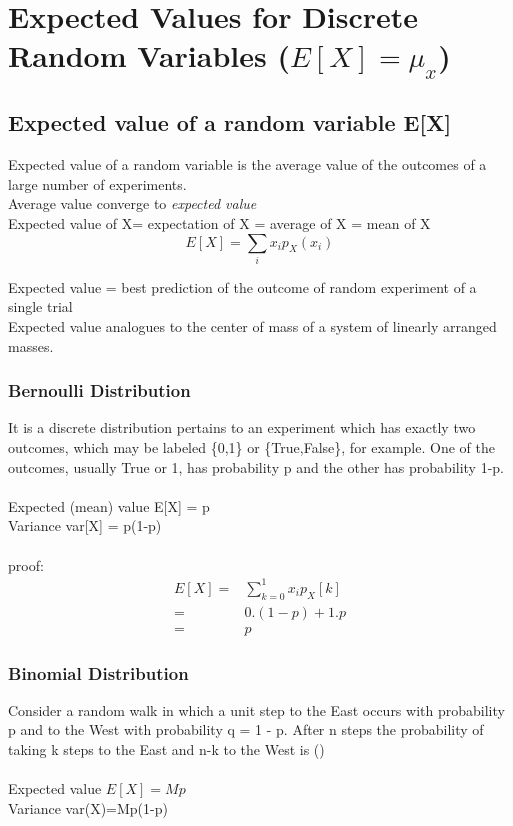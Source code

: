 \section{Expected Values for Discrete Random Variables  ($E[X]=\mu_{x}$)}
\subsection{Expected value of a random variable E[X]} 
Expected value of a random variable is the average value of the outcomes of a large number of experiments.\\

Average value converge to \emph{expected value}\\
{\color{red}Expected value} of X= {\color{red}expectation} of X = {\color{red}average} of X = {\color{red}mean} of X
\begin{equation*}
	E[X]=\sum_{i}x_{i}p_{X}(x_{i})
\end{equation*}

Expected value = best prediction of the outcome of random experiment of a single trial\\

Expected value analogues to the center of mass of a system of linearly arranged masses.

\subsubsection{Bernoulli Distribution}
It is a discrete distribution pertains to an experiment which has exactly two outcomes, which may be labeled \{0,1\} or \{True,False\}, for example. One of the outcomes, usually True or 1, has probability p and the other has probability 1-p. \\\\
{\color{blue}Expected (mean) value E[X] = p}\\
{\color{blue}Variance var[X] = p(1-p)}\\\\

proof:
\begin{equation*}
	\begin{split}
		E[X]
			=&
				\sum^{1}_{k=0}x_{i}p_{X}[k]\\
			=&
				0.(1-p)+1.p\\
			=&
				p
	\end{split}
\end{equation*}

\subsubsection{Binomial Distribution}
Consider a random walk in which a unit step to the East occurs with probability p and to the West with probability q = 1 - p. After n steps the probability of taking k steps to the East and n-k to the West is ()\\\\
{\color{blue}Expected value $E[X]=Mp$}\\
{\color{blue}Variance var(X)=Mp(1-p)}\\


